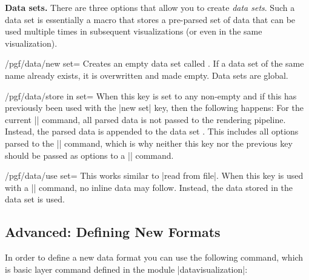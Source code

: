 \begin{command}{\pgfdata{}}
    \medskip
    \textbf{Data sets.}
    There are three options that allow you to create \emph{data sets}. Such a
    data set is essentially a macro that stores a pre-parsed set of data that
    can be used multiple times in subsequent visualizations (or even in the
    same visualization).
    \begin{key}{/pgf/data/new set=}
        Creates an empty data set called . If a data set of the same
        name already exists, it is overwritten and made empty. Data sets are
        global.
    \end{key}
    \begin{key}{/pgf/data/store in set=}
        When this key is set to any non-empty  and if this
         has previously been used with the |new set| key, then the
        following happens: For the current |\pgfdata| command, all parsed data
        is not passed to the rendering pipeline. Instead, the parsed data is
        appended to the data set . This includes all options parsed
        to the |\pgfdata| command, which is why neither this key nor the
        previous key should be passed as options to a |\pgfdata| command.
    \end{key}
    \begin{key}{/pgf/data/use set=}
        This works similar to |read from file|. When this key is used with a
        |\pgfdata| command, no inline data may follow. Instead, the data stored
        in the data set  is used.
    \end{key}
\end{command}


\subsection{Advanced: Defining New Formats}
\label{section-dv-declaring-formats}

In order to define a new data format you can use the following command, which
is basic layer command defined in the module |datavisualization|:

